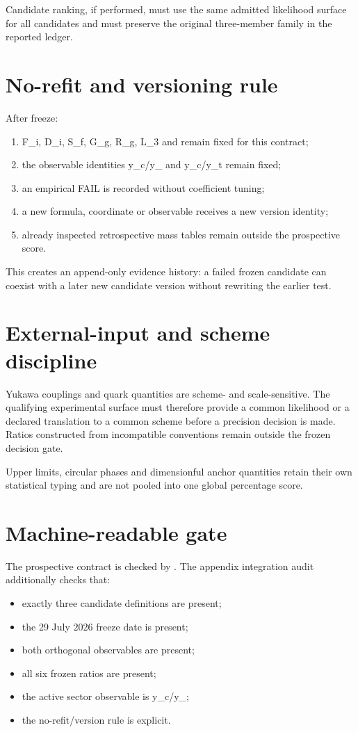 \documentclass[11pt,a4paper,twoside]{book}
\def\({}%
\def\){}%
\theoremstyle{definition}
\begin{document}
Candidate ranking, if performed, must use the same admitted likelihood surface
for all candidates and must preserve the original three-member family in the
reported ledger.

\section{No-refit and versioning rule}

After freeze:
\begin{enumerate}
\item \(F_i\), \(D_i\), \(S_f\), \(G_g\), \(R_g\), \(L_3\) and \(\kappa\) remain fixed for this contract;
\item the observable identities \(y_c/y_\mu\) and \(y_c/y_t\) remain fixed;
\item an empirical FAIL is recorded without coefficient tuning;
\item a new formula, coordinate or observable receives a new version identity;
\item already inspected retrospective mass tables remain outside the prospective score.
\end{enumerate}

This creates an append-only evidence history: a failed frozen candidate can
coexist with a later new candidate version without rewriting the earlier test.

\section{External-input and scheme discipline}

Yukawa couplings and quark quantities are scheme- and scale-sensitive.
The qualifying experimental surface must therefore provide a common likelihood
or a declared translation to a common scheme before a precision decision is
made.  Ratios constructed from incompatible conventions remain outside the
frozen decision gate.

Upper limits, circular phases and dimensionful anchor quantities retain their
own statistical typing and are not pooled into one global percentage score.

\section{Machine-readable gate}

The prospective contract is checked by
.
The appendix integration audit additionally checks that:
\begin{itemize}
\item exactly three candidate definitions are present;
\item the 29 July 2026 freeze date is present;
\item both orthogonal observables are present;
\item all six frozen ratios are present;
\item the active sector observable is \(y_c/y_\mu\);
\item the no-refit/version rule is explicit.
\end{itemize}
\end{document}
